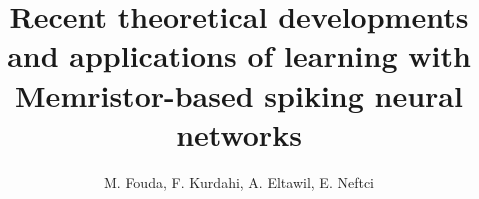 \documentclass[english]{article}
\begin{document}


\title{Recent theoretical developments and applications of learning with Memristor-based spiking neural networks}
\author{M. Fouda, F. Kurdahi, A. Eltawil, E. Neftci}
\maketitle

\begin{abstract}


\end{abstract}
\end{document}
